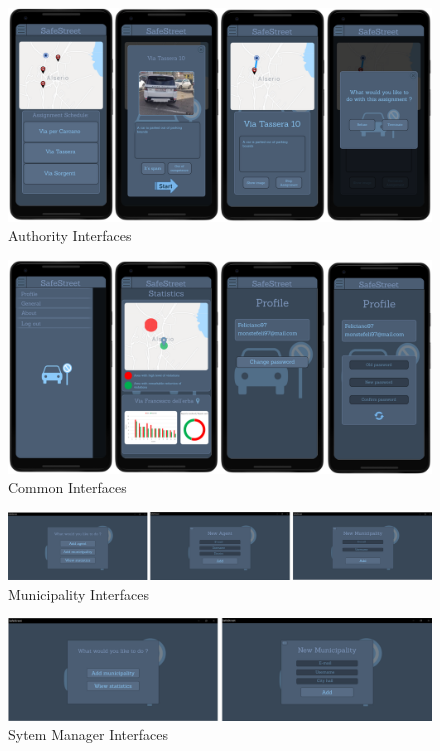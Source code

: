 \begin{figure}[h]
\centering
\includegraphics[width=\textwidth]{Images/agent_interface.png}
\caption{\label{fig:AI}Authority Interfaces }
\end{figure}

\begin{figure}[h]
\centering
\includegraphics[width=\textwidth]{Images/common_interface.png}
\caption{\label{fig:ComI}Common Interfaces }
\end{figure}

\begin{figure}[h]
\centering
\includegraphics[width=\textwidth]{Images/municipality_interface.png}
\caption{\label{fig:MI}Municipality Interfaces }
\end{figure}

\begin{figure}[h]
\centering
\includegraphics[width=\textwidth]{Images/system_manager_interface.png}
\caption{\label{fig:SMI}Sytem Manager Interfaces}
\end{figure}

